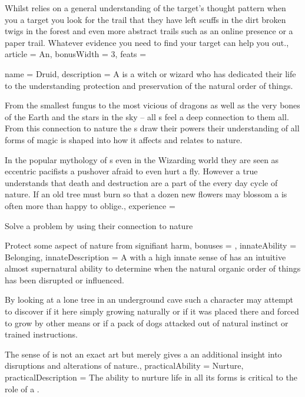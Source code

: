 {Whilst  relies on a general understanding of the target's thought pattern\comma{} when you  a target you look for the trail that they have left \minus{} scuffs in the dirt\comma{} broken twigs in the forest and even more abstract trails such as an online presence or a paper trail. Whatever evidence you need to find your target\comma{}  can help you out.,
	article = An,
	bonusWidth = 3, feats = \AurorFeats
}

\archetype
{
	name = Druid,
	description = A {\bname{}} is a witch or wizard who has dedicated their life to the understanding\comma{} protection and preservation of the natural order of things. 

From the smallest fungus\comma{} to the most vicious of dragons\comma{} as well as the very bones of the Earth\comma{} and the stars in the sky – all {\bname{}}s feel a deep connection to them all. From this connection to nature\comma{} the \bname{}s draw their powers their understanding of all forms of magic is shaped into how it affects and relates to nature.

In the popular mythology of \bname{}s\comma{} even in the Wizarding world\comma{} they are seen as eccentric pacifists\comma{} a pushover afraid to even hurt a fly. However\comma{} a true \bname{} understands that death and destruction are a part of the every day cycle of nature. If an old tree must burn so that a dozen new flowers may blossom\comma{} a  is often more than happy to oblige.,
	experience = \item Solve a problem by using their connection to nature
\item Protect some aspect of nature from signifiant harm,
	bonuses = 
,
	innateAbility = Belonging,
	innateDescription = A \bname{} with a high innate sense of  has an intuitive\comma{} almost supernatural ability to determine when the natural\comma{} organic\comma{} order of things has been disrupted or influenced.

By looking at a lone tree in an underground cave\comma{} such a character may attempt to discover if it  here\comma{} simply growing naturally\comma{} or if it was placed there and forced to grow by other means\comma{} or if a pack of dogs attacked out of natural instinct\comma{} or trained instructions. 

The sense of  is not an exact art\comma{} but merely gives a \bname{} an additional insight into disruptions and alterations of nature.,
	practicalAbility = Nurture,
	practicalDescription = The ability to nurture life\comma{} in all its forms\comma{} is critical to the role of a \bname{}. 

}

